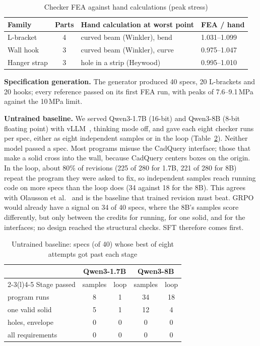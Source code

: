 \documentclass[conference]{IEEEtran}
\begin{document}
\begin{table}[t]
\caption{Checker FEA against hand calculations (peak stress)}
\label{tab:oracle}
\centering\footnotesize
\begin{tabular}{@{}lcll@{}}
\toprule
Family & Parts & Hand calculation at worst point & FEA / hand\\
\midrule
L-bracket & 4 & curved beam (Winkler), bend & 1.031--1.099\\
Wall hook & 3 & curved beam (Winkler), curve & 0.975--1.047\\
Hanger strap & 3 & hole in a strip (Heywood) & 0.995--1.010\\
\bottomrule
\end{tabular}
\end{table}

\textbf{Specification generation.} The generator produced 40 specs, 20 L-brackets and 20 hooks; every
reference passed on its first FEA run, with peaks of 7.6--9.1\,MPa against the
10\,MPa limit.

\textbf{Untrained baseline.} We served Qwen3-1.7B (16-bit) and Qwen3-8B (8-bit floating
point) with vLLM~\cite{kwon2023vllm}, thinking mode off, and gave each eight checker runs per spec,
either as eight independent samples or in the loop (Table~\ref{tab:baseline}). Neither model passed a
spec. Most programs misuse the CadQuery interface; those that make a solid cross into the wall, because
CadQuery centers boxes on the origin. In the loop, about 80\% of revisions (225 of 280 for 1.7B, 221 of
280 for 8B) repeat the program they were asked to fix, so independent samples reach running code on more
specs than the loop does (34 against 18 for the 8B). This agrees with Olausson et al.~\cite{olausson2024selfrepair}
and is the baseline that trained revision must beat. GRPO would already have a signal on 34 of 40 specs,
where the 8B's samples score differently, but only between the credits for running, for one solid, and
for the interfaces; no design reached the structural checks. SFT therefore comes first.

\begin{table}[t]
\caption{Untrained baseline: specs (of 40) whose best of eight attempts got past each stage}
\label{tab:baseline}
\centering\footnotesize
\setlength{\tabcolsep}{4pt}
\begin{tabular}{@{}lcccc@{}}
\toprule
& \multicolumn{2}{c}{Qwen3-1.7B} & \multicolumn{2}{c}{Qwen3-8B}\\
\cmidrule(lr){2-3}\cmidrule(l){4-5}
Stage passed & samples & loop & samples & loop\\
\midrule
program runs & 8 & 1 & 34 & 18\\
one valid solid & 5 & 1 & 12 & 4\\
holes, envelope & 0 & 0 & 0 & 0\\
all requirements & 0 & 0 & 0 & 0\\
\bottomrule
\end{tabular}
\end{table}
\end{document}

